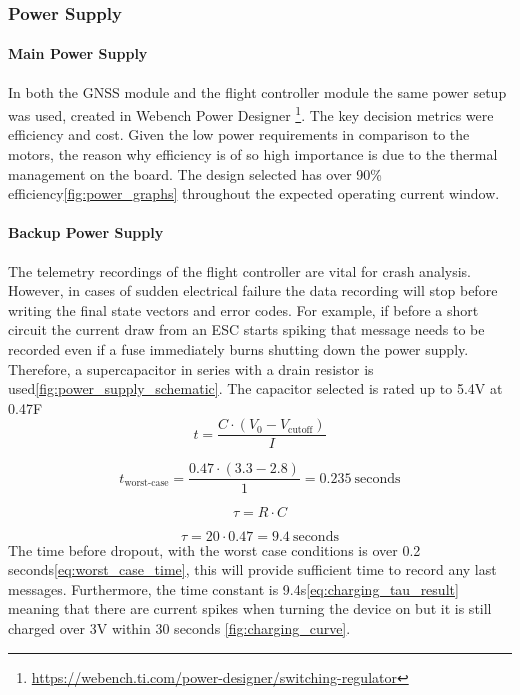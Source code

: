 \subsubsection{Power Supply}
\paragraph{Main Power Supply}
In both the GNSS module and the flight controller module the same power setup was used, created in Webench Power Designer \footnote{\url{https://webench.ti.com/power-designer/switching-regulator}}. The key decision metrics were efficiency and cost. Given the low power requirements in comparison to the motors, the reason why efficiency is of so high importance is due to the thermal management on the board. The design selected has over 90\% efficiency\ref{fig:power_graphs} throughout the expected operating current window.

\paragraph{Backup Power Supply}
The telemetry recordings of the flight controller are vital for crash analysis. However, in cases of sudden electrical failure the data recording will stop before writing the final state vectors and error codes. For example, if before a short circuit the current draw from an \gls{ESC} starts spiking that message needs to be recorded even if a fuse immediately burns shutting down the power supply. Therefore, a supercapacitor in series with a drain resistor is used\ref{fig:power_supply_schematic}. The capacitor selected is rated up to 5.4V at 0.47F%
\begin{equation}
t = \frac{C \cdot (V_0 - V_{\text{cutoff}})}{I}
\label{eq:discharge_time}
\end{equation}

\begin{equation}
t_{\text{worst-case}} = \frac{0.47 \cdot (3.3 - 2.8)}{1} = 0.235\ \text{seconds}
\label{eq:worst_case_time}
\end{equation}

\begin{equation}
\tau = R \cdot C
\label{eq:charging_time_constant}
\end{equation}

\begin{equation}
\tau = 20 \cdot 0.47 = 9.4\ \text{seconds}
\label{eq:charging_tau_result}
\end{equation}
The time before dropout, with the worst case conditions is over 0.2 seconds\ref{eq:worst_case_time}, this will provide sufficient time to record any last messages. Furthermore, the time constant is 9.4s\ref{eq:charging_tau_result} meaning that there are current spikes when turning the device on but it is still charged over 3V within 30 seconds \ref{fig:charging_curve}.
